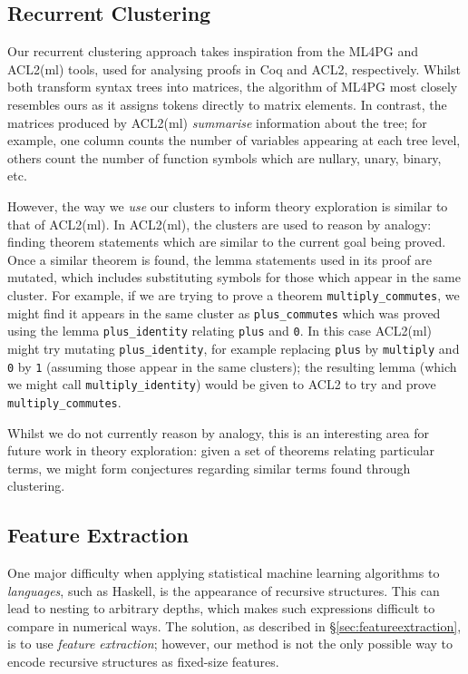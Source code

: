 \subsection{Recurrent Clustering}
\label{sec:clusteringexpressions}

Our recurrent clustering approach takes inspiration from the ML4PG \citep{journals/corr/abs-1212-3618} and ACL2(ml) \citep{heras2013proof} tools, used for analysing proofs in Coq and ACL2, respectively. Whilst both transform syntax trees into matrices, the algorithm of ML4PG most closely resembles ours as it assigns tokens directly to matrix elements. In contrast, the matrices produced by ACL2(ml) \emph{summarise} information about the tree; for example, one column counts the number of variables appearing at each tree level, others count the number of function symbols which are nullary, unary, binary, etc.

However, the way we \emph{use} our clusters to inform theory exploration is similar to that of ACL2(ml). In ACL2(ml), the clusters are used to reason by analogy: finding theorem statements which are similar to the current goal being proved. Once a similar theorem is found, the lemma statements used in its proof are mutated, which includes substituting symbols for those which appear in the same cluster. For example, if we are trying to prove a theorem \texttt{multiply\_commutes}, we might find it appears in the same cluster as \texttt{plus\_commutes} which was proved using the lemma \texttt{plus\_identity} relating \texttt{plus} and \texttt{0}. In this case ACL2(ml) might try mutating \texttt{plus\_identity}, for example replacing \texttt{plus} by \texttt{multiply} and \texttt{0} by \texttt{1} (assuming those appear in the same clusters); the resulting lemma (which we might call \texttt{multiply\_identity}) would be given to ACL2 to try and prove \texttt{multiply\_commutes}.

Whilst we do not currently reason by analogy, this is an interesting area for future work in theory exploration: given a set of theorems relating particular terms, we might form conjectures regarding similar terms found through clustering.

\iffalse
We could expand this a bit, e.g. talking about how we both use Weka, etc.
\fi

\subsection{Feature Extraction}

One major difficulty when applying statistical machine learning algorithms to \emph{languages}, such as Haskell, is the appearance of recursive structures. This can lead to nesting to arbitrary depths, which makes such expressions difficult to compare in numerical ways. The solution, as described in \S \ref{sec:featureextraction}, is to use \emph{feature extraction}; however, our method is not the only possible way to encode recursive structures as fixed-size features.

